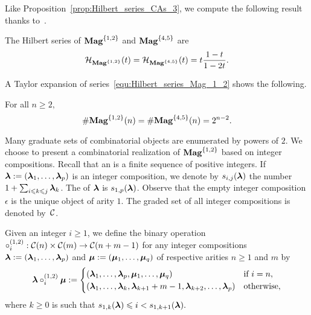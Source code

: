 Like Proposition~\ref{prop:Hilbert_series_CAs_3}, we compute the
following result thanks to~\cite{Gir18}.
\medbreak

\begin{Theorem} \label{thm:Hilbert_series_Mag_1_2}
    The Hilbert series of $\mathbf{Mag}^{\{1, 2\}}$ and $\mathbf{Mag}^{\{4, 5\}}$ are
    \begin{equation} \label{equ:Hilbert_series_Mag_1_2}
        \mathcal{H}_{\mathbf{Mag}^{\{1, 2\}}}(t)
        = \mathcal{H}_{\mathbf{Mag}^{\{4, 5\}}}(t) =
        t \frac{1 - t}{1 - 2t}.
    \end{equation}
\end{Theorem}
\medbreak

A Taylor expansion of series~\eqref{equ:Hilbert_series_Mag_1_2} shows
the following.
\medbreak

\begin{Proposition} \label{prop:Close_formula_Mag_1_2}
    For all $n \geq 2,$
    \begin{equation} \label{equ:Close_formula_Mag_1_2}
        \# \mathbf{Mag}^{\{1, 2\}}(n) = \# \mathbf{Mag}^{\{4, 5\}}(n) = 2^{n-2}.
    \end{equation}
\end{Proposition}
\medbreak

Many graduate sets of combinatorial objects are enumerated by powers of
$2$. We choose to present a combinatorial realization of
$\mathbf{Mag}^{\{1, 2\}}$ based on integer compositions. Recall that an
 is a finite sequence of positive integers. If
$\bm{\lambda} := \left(\bm{\lambda}_1, \dots, \bm{\lambda}_p\right)$ is an integer
composition, we denote by $s_{i, j}(\bm{\lambda})$ the number
$1 + \sum_{i \leqslant k \leqslant j} \bm{\lambda}_k$. The  of $\bm{\lambda}$
is $s_{1, p}(\bm{\lambda})$. Observe that the empty integer composition
$\epsilon$ is the unique object of arity $1$. The graded set of all
integer compositions is denoted by~$\mathcal{C}$.
\medbreak

Given an integer $i \geq 1$, we define the binary operation
\begin{math}
    \circ_i^{(1,2)} : \mathcal{C}(n) \times \mathcal{C}(m)
    \to\mathcal{C}(n + m - 1)
\end{math}
for any integer compositions
$\bm{\lambda} := \left(\bm{\lambda}_1, \dots, \bm{\lambda}_p\right)$ and
$\bm{\mu} := \left(\bm{\mu}_1, \dots, \bm{\mu}_q\right)$ of respective arities
$n \geq 1$ and $m$ by
\begin{equation}
    \bm{\lambda} \circ_i^{(1,2)} \bm{\mu} :=
    \begin{cases}
        \left(\bm{\lambda}_1, \dots, \bm{\lambda}_p,
        \bm{\mu}_1, \dots, \bm{\mu}_q\right) &
        \mbox{if } i = n, \\
        \left(\bm{\lambda}_1, \dots, \bm{\lambda}_k, \bm{\lambda}_{k + 1} + m - 1,
        \bm{\lambda}_{k + 2}, \dots, \bm{\lambda}_p\right)
            & \mbox{otherwise},
    \end{cases}
\end{equation}
where $k \geq 0$ is such that
\begin{math}
    s_{1, k}(\bm{\lambda}) \leqslant i < s_{1, k + 1}(\bm{\lambda}).
\end{math}
\medbreak

